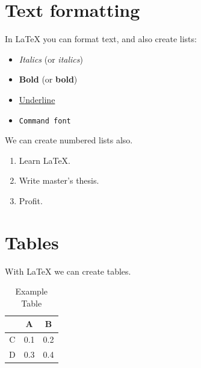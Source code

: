 \documentclass{article}[12pt]
\begin{document}
    \newpage
    
    \section{Text formatting}
        
        In \LaTeX{} you can format text, and also create lists:
        
        \begin{itemize}
            \item 
            \textit{Italics} (or {\it italics})
            
            \item
            \textbf{Bold} (or {\bf bold})
            
            \item
            \underline{Underline}
            
            \item
            \texttt{Command font}
            
        \end{itemize}
        
        We can create numbered lists also.
        
        \begin{enumerate}
            \item 
            Learn \LaTeX.
            
            \item
            Write master's thesis.
            
            \item
            Profit.
        \end{enumerate}
        
    
    
    \section{Tables}
        
        With \LaTeX{} we can create tables.
        \begin{table}[H] %
            \centering
            \begin{tabular}{|c||c|c|} %
                \hline %
                   & A   & B \\
                 \hline\hline %
                 C & 0.1 & 0.2 \\
                 \hline
                 D & 0.3 & 0.4 \\
                 \hline %
            \end{tabular}
            \caption{Example Table} %
        \end{table}
        
\end{document}
